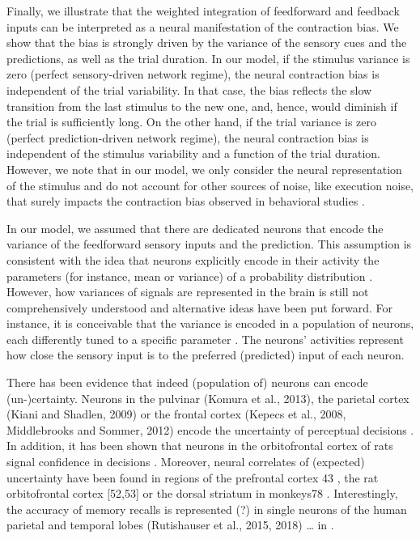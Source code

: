 \documentclass[10pt,a4paper,draft]{article}
\begin{document}
Finally, we illustrate that the weighted integration of feedforward and feedback inputs can be interpreted as a neural manifestation of the contraction bias. We show that the bias is strongly driven by the variance of the sensory cues and the predictions, as well as the trial duration. In our model, if the stimulus variance is zero (perfect sensory-driven network regime), the neural contraction bias is independent of the trial variability. In that case, the bias reflects the slow transition from the last stimulus to the new one, and, hence, would diminish if the trial is sufficiently long. On the other hand, if the trial variance is zero (perfect prediction-driven network regime), the neural contraction bias is independent of the stimulus variability and a function of the trial duration. However, we note that in our model, we only consider the neural representation of the stimulus and do not account for other sources of noise, like execution noise, that surely impacts the contraction bias observed in behavioral studies \citep{XXX}.


In our model, we assumed that there are dedicated neurons that encode the variance of the feedforward sensory inputs and the prediction. This assumption is consistent with the idea that neurons explicitly encode in their activity the parameters (for instance, mean or variance) of a probability distribution \citep{ONeill Schultz, 2010, XXX}. However, how variances of signals are represented in the brain is still not comprehensively understood and alternative ideas have been put forward. For instance, it is conceivable that the variance is encoded in a population of neurons, each differently tuned to a specific parameter \citep{knill2004bayesian, Ma et al., 2006, 2008}. The neurons' activities represent how close the sensory input is to the preferred (predicted) input of each neuron. 


There has been evidence that indeed (population of) neurons can encode (un-)certainty. Neurons in the pulvinar (Komura et al., 2013), the parietal cortex (Kiani and Shadlen, 2009) or the frontal cortex (Kepecs et al., 2008, Middlebrooks and Sommer, 2012) encode the uncertainty of perceptual decisions \citep{masset2020behavior}. In addition, it has been shown that neurons in the orbitofrontal cortex of rats signal confidence in decisions \citep{masset2020behavior}. Moreover, neural correlates of (expected) uncertainty have been found in regions of the prefrontal cortex 43 \citep{soltani2019adaptive} , the rat orbitofrontal cortex [52,53\citep{soltani2019adaptive}] or the dorsal striatum in monkeys78 \citep{soltani2019adaptive}. Interestingly, the accuracy of memory recalls is represented (?) in single neurons of the human parietal and temporal lobes (Rutishauser et al., 2015, 2018) … in \citep{masset2020behavior}.
\end{document}
